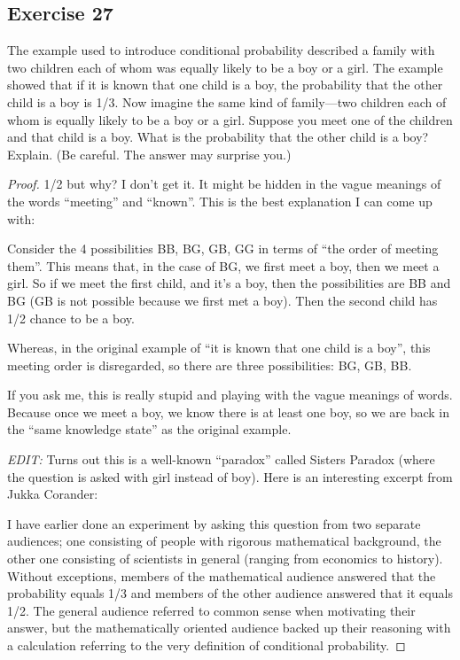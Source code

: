 \documentclass[14pt]{extarticle}
\begin{document}
\subsection{Exercise 27}
The example used to introduce conditional probability described a family with two children each of whom was equally 
likely to be a boy or a girl. The example showed that if it is known that one child is a boy, the probability that the other 
child is a boy is 1/3. Now imagine the same kind of family—two children each of whom is equally likely to be a boy or a girl. 
Suppose you meet one of the children and that child is a boy. What is the probability that the other child is a boy? 
Explain. (Be careful. The answer may surprise you.)

\begin{proof}
1/2 but why? I don't get it. It might be hidden in the vague meanings of the words ``meeting'' and ``known''. This is the 
best explanation I can come up with:

Consider the 4 possibilities BB, BG, GB, GG in terms of ``the order of meeting them''. This means that, in the case of BG,
we first meet a boy, then we meet a girl. So if we meet the first child, and it's a boy, then the possibilities are BB and
BG (GB is not possible because we first met a boy). Then the second child has 1/2 chance to be a boy.

Whereas, in the original example of ``it is known that one child is a boy'', this meeting order is disregarded, so there
are three possibilities: BG, GB, BB.

If you ask me, this is really stupid and playing with the vague meanings of words. Because once we meet a boy, we know
there is at least one boy, so we are back in the ``same knowledge state'' as the original example.

{\it EDIT:} Turns out this is a well-known ``paradox'' called Sisters Paradox (where the question is asked with girl instead
of boy). Here is an interesting excerpt from Jukka Corander:

I have earlier done an experiment by asking this question from two separate audiences; one consisting of people with rigorous 
mathematical background, the other one consisting of scientists in general (ranging from economics to history). 
Without exceptions, members of the mathematical audience answered that the probability equals 1/3 and members of the 
other audience answered that it equals 1/2. The general audience referred to common sense when motivating their 
answer, but the mathematically oriented audience backed up their reasoning with a calculation referring to the very 
definition of conditional probability.


\end{proof}
\end{document}
